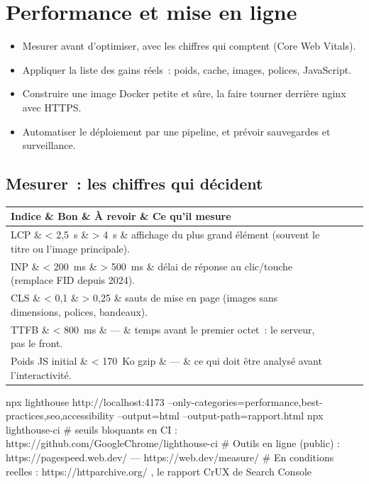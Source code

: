 \documentclass[12pt,a4paper,twoside,openright]{book}
\makeatletter
\newenvironment{tabz}[1]{\rowcolors{2}{white}{tralight}%
  \small\setlength{\tabcolsep}{5pt}\setlength{\LTpre}{3pt}\setlength{\LTpost}{3pt}%
  \begin{longtable}{@{}#1@{}}\toprule}
  {\bottomrule\end{longtable}\normalfont\setlength{\tabcolsep}{6pt}}
\newcommand{\thd}[1]{\textbf{\color{white}#1}}
\newcommand{\headrow}{\rowcolor{theadbg}}
\makeatother
\begin{document}
\chapter{Performance et mise en ligne}
\label{ch-deploy}

\begin{objectif}
\begin{itemize}
  \item Mesurer avant d'optimiser, avec les chiffres qui comptent (Core Web Vitals).
  \item Appliquer la liste des gains r\'eels~: poids, cache, images, polices, JavaScript.
  \item Construire une image Docker petite et s\^ure, la faire tourner derri\`ere nginx avec HTTPS.
  \item Automatiser le d\'eploiement par une pipeline, et pr\'evoir sauvegardes et surveillance.
\end{itemize}
\end{objectif}

\section{Mesurer~: les chiffres qui d\'ecident}

\begin{tabz}{lllX}
  \headrow \thd{Indice} \& \thd{Bon} \& \thd{\`A revoir} \& \thd{Ce qu'il mesure} \\
  \midrule
  LCP \& < 2{,}5~s \& > 4~s \& affichage du plus grand \'el\'ement (souvent le titre ou l'image principale). \\
  INP \& < 200~ms \& > 500~ms \& d\'elai de r\'eponse au clic/touche (remplace FID depuis 2024). \\
  CLS \& < 0{,}1 \& > 0{,}25 \& sauts de mise en page (images sans dimensions, polices, bandeaux). \\
  TTFB \& < 800~ms \& --- \& temps avant le premier octet~: le serveur, pas le front. \\
  Poids JS initial \& < 170~Ko gzip \& --- \& ce qui doit \^etre analys\'e avant l'interactivit\'e. \\
\end{tabz}

\begin{terminal}
npx lighthouse http://localhost:4173 --only-categories=performance,best-practices,seo,accessibility --output=html --output-path=rapport.html
npx lighthouse-ci   # seuils bloquants en CI : https://github.com/GoogleChrome/lighthouse-ci
# Outils en ligne (public) : https://pagespeed.web.dev/  ---  https://web.dev/measure/
# En conditions reelles : https://httparchive.org/ , le rapport CrUX de Search Console
\end{terminal}
\end{document}
